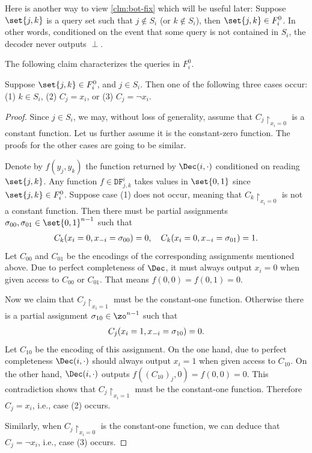 Here is another way to view \cref{clm:bot-fix} which will be useful later: Suppose $\set{j, k}$ is a query set such that $j \notin S_i$ (or $k \notin S_i$), then $\set{j, k} \in F_{i}^{0}$. In other words, conditioned on the event that some query is not contained in $S_i$, the decoder never outputs $\perp$.

The following claim characterizes the queries in $F_i^{0}$.
\begin{claim} \label{clm:fixable-or-useless}
Suppose $\set{j,k} \in F_{i}^{0}$, and $j \in S_i$. Then one of the following three cases occur: (1) $k \in S_i$, (2) $C_j=x_i$, or (3) $C_j=\neg x_i$.
\end{claim}
\begin{proof}
Since $j \in S_i$, we may, without loss of generality, assume that $C_j\restriction_{x_i=0}$ is a constant function. Let us further assume it is the constant-zero function. The proofs for the other cases are going to be similar. 

Denote by $f(y_j, y_k)$ the function returned by $\Dec(i,\cdot)$ conditioned on reading $\set{j,k}$. Any function $f \in \mathtt{DF}_{j,k}^i$ takes values in $\set{0,1}$ since $\set{j,k} \in F_i^{0}$. Suppose case (1) does not occur, meaning that $C_k\restriction_{x_i=0}$ is not a constant function. Then there must be partial assignments $\sigma_{00}, \sigma_{01} \in \set{0,1}^{n-1}$ such that
\begin{align*}
    C_k(x_i=0, \*x_{-i}=\sigma_{00}) = 0, \quad C_k(x_i=0, \*x_{-i}=\sigma_{01}) = 1.
\end{align*}
Let $C_{00}$ and $C_{01}$ be the encodings of the corresponding assignments mentioned above. Due to perfect completeness of $\Dec$, it must always output $x_i = 0$ when given access to $C_{00}$ or $C_{01}$. That means $f(0,0)=f(0,1)=0$.

Now we claim that $C_j\restriction_{x_i=1}$ must be the constant-one function. Otherwise there is a partial assignment $\sigma_{10} \in \zo^{n-1}$ such that
\begin{align*}
    C_j(x_i=1, \*x_{-i}=\sigma_{10}) = 0.
\end{align*}
Let $C_{10}$ be the encoding of this assignment. On the one hand, due to perfect completeness $\Dec(i,\cdot)$ should always output $x_i=1$ when given access to $C_{10}$. On the other hand, $\Dec(i,\cdot)$ outputs $f((C_{10})_j,0)=f(0,0)=0$. This contradiction shows that $C_j\restriction_{x_i=1}$ must be the constant-one function. Therefore $C_j=x_i$, i.e., case (2) occurs.

Similarly, when $C_j\restriction_{x_i=0}$ is the constant-one function, we can deduce that $C_j=\neg x_i$, i.e., case (3) occurs.
\end{proof}

